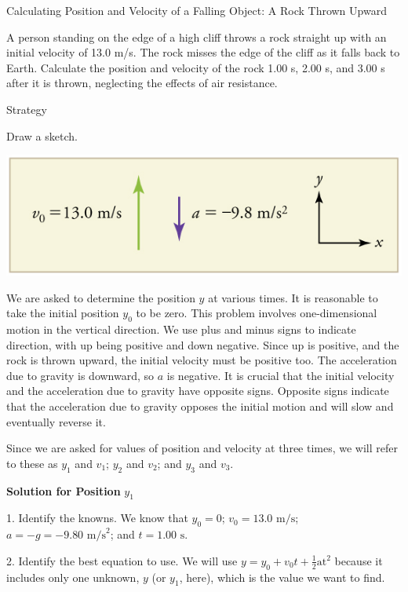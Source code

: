 \documentclass[
]{book}
\begin{document}
\hypertarget{fs-id4067058}{}
Calculating Position and Velocity of a Falling Object: A Rock Thrown
Upward

A person standing on the edge of a high cliff throws a rock straight up
with an initial velocity of 13.0 m/s. The rock misses the edge of the
cliff as it falls back to Earth. Calculate the position and velocity of
the rock 1.00 s, 2.00 s, and 3.00 s after it is thrown, neglecting the
effects of air resistance.

{Strategy}

Draw a sketch.

\includegraphics{images/Figure_02_07_00b.jpg}

We are asked to determine the position \(y{}\) at various times. It is
reasonable to take the initial position \(y_{0}{}\) to be zero. This
problem involves one-dimensional motion in the vertical direction. We
use plus and minus signs to indicate direction, with up being positive
and down negative. Since up is positive, and the rock is thrown upward,
the initial velocity must be positive too. The acceleration due to
gravity is downward, so \(a{}\) is negative. It is crucial that the
initial velocity and the acceleration due to gravity have opposite
signs. Opposite signs indicate that the acceleration due to gravity
opposes the initial motion and will slow and eventually reverse it.

Since we are asked for values of position and velocity at three times,
we will refer to these as \(y_{1}{}\) and \(v_{1}{}\); \emph{\(y_{2}{}\)} and
\(v_{2}{}\); and \(y_{3}{}\) and \(v_{3}{}\).

\textbf{Solution for Position} \(y_{1}{}\)

1. Identify the knowns. We know that \({y_{0} = 0}{}\);
\({{v_{0} = \text{13}}\text{.}\text{0\ m/s}}{}\);
\({{{a = {- g}} = {- 9}}\text{.}\text{80\ m/s}^{2}}{}\); and
\({{t = 1}\text{.}\text{00\ s}}{}\).

2. Identify the best equation to use. We will use
\({{y = {y_{0} + v_{0}}}{t + \frac{1}{2}}\text{at}^{2}}{}\) because it
includes only one unknown, \(y{}\) (or \(y_{1}{}\),
here),\emph{} which is the value we want to
find.
\end{document}
